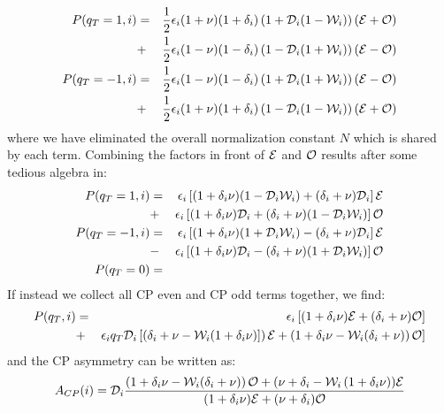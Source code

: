 \documentclass[a4paper,9pt,twoside]{article}
\begin{document}
\begin{eqnarray}
   P(q_T=1,i)  &=&\frac{1}{2} \epsilon_i(1+\nu)(1+\delta_i)\left(1+{\cal D}_i(1-{\cal W}_i)\right)\left({\cal E}+{\cal O}\right)  
\\             &+&\frac{1}{2} \epsilon_i(1-\nu)(1-\delta_i)\left(1-{\cal D}_i(1+{\cal W}_i)\right)\left({\cal E}-{\cal O}\right)  
\\ P(q_T=-1,i) &=&\frac{1}{2} \epsilon_i(1-\nu)(1-\delta_i)\left(1+{\cal D}_i(1+{\cal W}_i)\right)\left({\cal E}-{\cal O}\right) 
\\             &+&\frac{1}{2} \epsilon_i(1+\nu)(1+\delta_i)\left(1-{\cal D}_i(1-{\cal W}_i)\right)\left({\cal E}+{\cal O}\right)
\end{eqnarray}
where we have eliminated the overall normalization constant $N$ which is shared by each term. 
Combining the factors in front of ${\cal E}$ 
and ${\cal O}$ results after some tedious algebra in:
\begin{eqnarray}
     P(q_T=1,i)  
           &=& \epsilon_i\left[ (1+\delta_i\nu)  (1-{\cal D}_i {\cal W}_i)  +  (\delta_i+\nu)     {\cal D}_i       \right]{\cal E}
\\         &+& \epsilon_i\left[ (1+\delta_i\nu)     {\cal D}_i              +  (\delta_i+\nu)  (1-{\cal D}_i{\cal W}_i ) \right]{\cal O}
\\   P(q_T=-1,i) 
           &=& \epsilon_i\left[ (1+\delta_i\nu)  (1+{\cal D}_i {\cal W}_i)  -  (\delta_i+\nu)     {\cal D}_i       \right]{\cal E}
\\         &-& \epsilon_i\left[ (1+\delta_i\nu)     {\cal D}_i              -  (\delta_i+\nu)  (1+{\cal D}_i{\cal W}_i ) \right]{\cal O}
\\   P(q_T=0)    &=&
\end{eqnarray}
If instead we collect all CP even and CP odd terms together, we find:
\begin{eqnarray}
     P(q_T,i)  &=& \epsilon_i\left[ (1+\delta_i\nu){\cal E} + (\delta_i+\nu){\cal O} \right]
\label{eq:substrule_s}
\\             &+& \epsilon_i q_T {\cal D}_i \left[ \left( \delta_i + \nu -{\cal W}_i(1+\delta_i\nu) ]\right) { \cal E} + \left( 1+\delta_i\nu - {\cal W}_i(\delta_i+\nu) \right){\cal O}  \right]
\label{eq:substrule_e}
\end{eqnarray}
and the CP asymmetry can be written as:
\begin{equation}
  A_{CP}(i) =  {\cal D}_i \frac{\left( 1+\delta_i\nu - {\cal W}_i(\delta_i+\nu) \right){\cal O}+(\nu+\delta_i-{\cal W}_i\left(1+\delta_i\nu\right) ){\cal E}}
                               {(1+\delta_i\nu){\cal E}+(\nu+\delta_i){\cal O} }
\end{equation}
\end{document}

